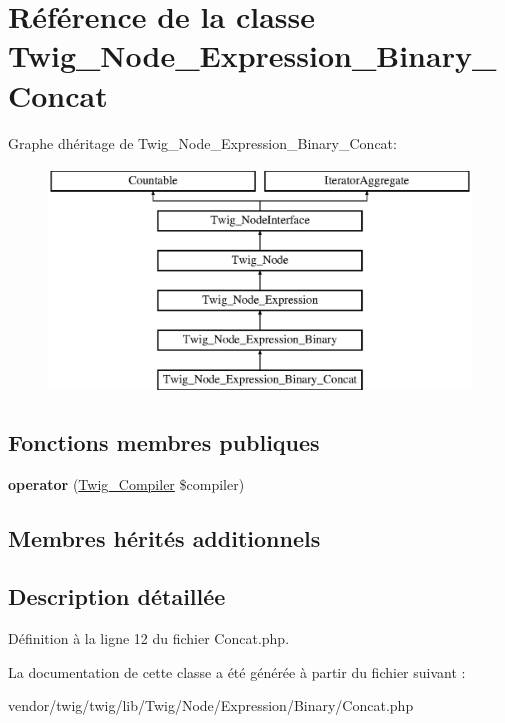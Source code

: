 \hypertarget{class_twig___node___expression___binary___concat}{}\section{Référence de la classe Twig\+\_\+\+Node\+\_\+\+Expression\+\_\+\+Binary\+\_\+\+Concat}
\label{class_twig___node___expression___binary___concat}
Graphe d\textquotesingle{}héritage de Twig\+\_\+\+Node\+\_\+\+Expression\+\_\+\+Binary\+\_\+\+Concat\+:\begin{figure}[H]
\begin{center}
\leavevmode
\includegraphics[height=6.000000cm]{class_twig___node___expression___binary___concat}
\end{center}
\end{figure}
\subsection*{Fonctions membres publiques}
\begin{DoxyCompactItemize}
\item 
{\bfseries operator} (\hyperlink{class_twig___compiler}{Twig\+\_\+\+Compiler} \$compiler)\hypertarget{class_twig___node___expression___binary___concat_af77318ec88d5f8a508684970a150b670}{}\label{class_twig___node___expression___binary___concat_af77318ec88d5f8a508684970a150b670}

\end{DoxyCompactItemize}
\subsection*{Membres hérités additionnels}


\subsection{Description détaillée}


Définition à la ligne 12 du fichier Concat.\+php.



La documentation de cette classe a été générée à partir du fichier suivant \+:\begin{DoxyCompactItemize}
\item 
vendor/twig/twig/lib/\+Twig/\+Node/\+Expression/\+Binary/Concat.\+php\end{DoxyCompactItemize}
